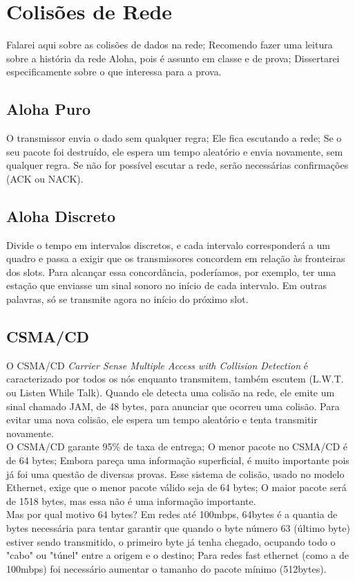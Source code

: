 \documentclass{article}
\begin{document}
\section{Colisões de Rede}

Falarei aqui sobre as colisões de dados na rede; Recomendo fazer uma leitura
sobre a história da rede Aloha, pois é assunto em classe e de prova; Dissertarei
especificamente sobre o que interessa para a prova.

\subsection{Aloha Puro}
O transmissor envia o dado sem qualquer regra; Ele fica escutando a rede; Se o
seu pacote foi destruído, ele espera um tempo aleatório e envia novamente, sem
qualquer regra. Se não for possível escutar a rede, serão necessárias
confirmações (ACK ou NACK).

\subsection{Aloha Discreto}
Divide o tempo em intervalos discretos, e cada intervalo corresponderá a um
quadro e passa a exigir que os transmissores concordem em relação às fronteiras
dos slots. Para alcançar essa concordância, poderíamos, por exemplo, ter uma
estação que enviasse um sinal sonoro no início de cada intervalo. Em outras
palavras, só se transmite agora no início do próximo slot.

\subsection{CSMA/CD}
O CSMA/CD \textit{Carrier Sense Multiple Access with Collision Detection} é
caracterizado por todos os nós enquanto transmitem, também escutem (L.W.T. ou
Listen While Talk). Quando ele detecta uma colisão na rede, ele emite um sinal
chamado JAM, de 48 bytes, para anunciar que ocorreu uma colisão. Para evitar uma
nova colisão, ele espera um tempo aleatório e tenta transmitir novamente.\\
O CSMA/CD garante 95\% de taxa de entrega; O menor pacote no CSMA/CD é de 64
bytes; Embora pareça uma informação superficial, é muito importante pois já foi
uma questão de diversas provas. Esse sistema de colisão, usado no modelo
Ethernet, exige que o menor pacote válido seja de 64 bytes; O maior pacote será
de 1518 bytes, mas essa não é uma informação importante.\\
Mas por qual motivo 64 bytes? Em redes até 100mbps, 64bytes é a quantia de bytes
necessária para tentar garantir que quando o byte número 63 (último byte) estiver sendo
transmitido, o primeiro byte já tenha chegado, ocupando todo o "cabo" ou "túnel"
entre a origem e o destino; Para redes fast ethernet (como a de 100mbps) foi
necessário aumentar o tamanho do pacote mínimo (512bytes).
\end{document}
